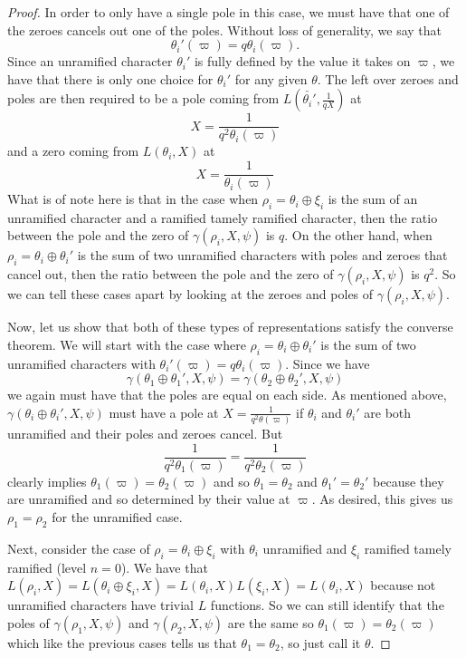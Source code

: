\begin{proof}
  In order to only have a single pole in this case, we must have that one of the zeroes cancels out one of the poles.
  Without loss of generality, we say that 
  \[\theta_i'(\varpi) = q\theta_i(\varpi).\]
  Since an unramified character $\theta_i'$ is fully defined by the value it takes on $\varpi$, we have that there is only one choice for $\theta_i'$ for any given $\theta$.
  The left over zeroes and poles are then required to be a pole coming from $L(\check{\theta_i'},\frac{1}{qX})$ at 
  \[X = \frac{1}{q^2 \theta_i(\varpi)}\]
  and a zero coming from $L(\theta_i,X)$ at
  \[X = \frac{1}{\theta_i(\varpi)}\]
  What is of note here is that in the case when $\rho_i = \theta_i \oplus \xi_i$ is the sum of an unramified character and a ramified tamely ramified character, then the ratio between the pole and the zero of $\gamma(\rho_i,X,\psi)$ is $q$.
  On the other hand, when $\rho_i = \theta_i \oplus \theta_i'$ is the sum of two unramified characters with poles and zeroes that cancel out, then the ratio between the pole and the zero of $\gamma(\rho_i,X,\psi)$ is $q^2$.
  So we can tell these cases apart by looking at the zeroes and poles of $\gamma(\rho_i,X,\psi)$.


  Now, let us show that both of these types of representations satisfy the converse theorem.
  We will start with the case where $\rho_i = \theta_i \oplus \theta_i'$ is the sum of two unramified characters with $\theta_i'(\varpi) = q \theta_i (\varpi)$.
  Since we have
  \[\gamma(\theta_1 \oplus \theta_1', X, \psi) = \gamma(\theta_2 \oplus \theta_2',X,\psi)\]
  we again must have that the poles are equal on each side.
  As mentioned above, $\gamma(\theta_i \oplus \theta_i' ,X, \psi)$ must have a pole at $X = \frac{1}{q^2 \theta(\varpi)}$ if $\theta_i$ and $\theta_i'$ are both unramified and their poles and zeroes cancel.
  But \[\frac{1}{q^2 \theta_1(\varpi)} = \frac{1}{q^2 \theta_2(\varpi)}\]
  clearly implies $\theta_1(\varpi) = \theta_2(\varpi)$ and so $\theta_1 = \theta_2$ and $\theta_1' = \theta_2'$ because they are unramified and so determined by their value at $\varpi$.
  As desired, this gives us $\rho_1 = \rho_2$ for the unramified case.

  Next, consider the case of $\rho_i = \theta_i \oplus \xi_i$ with $\theta_i$ unramified and $\xi_i$ ramified tamely ramified (level $n = 0$).
  We have that $L(\rho_i,X) = L(\theta_i \oplus \xi_i ,X) = L(\theta_i,X)L(\xi_i,X) = L(\theta_i,X)$ because not unramified characters have trivial $L$ functions.
  So we can still identify that the poles of $\gamma(\rho_1,X,\psi)$ and $\gamma(\rho_2,X,\psi)$ are the same so $\theta_1(\varpi) = \theta_2(\varpi)$ which like the previous cases tells us that $\theta_1 = \theta_2$, so just call it $\theta$.
  

\end{proof}

